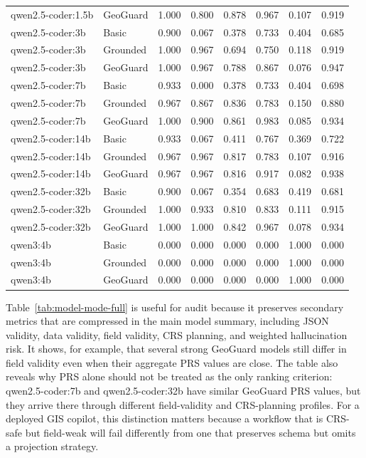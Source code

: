 \documentclass[12pt]{gsis}  %
\begin{document}
\begin{table}[htbp]
\begin{tabular}{llrrrrrr}
qwen2.5-coder:1.5b & GeoGuard & 1.000 & 0.800 & 0.878 & 0.967 & 0.107 & 0.919 \\
qwen2.5-coder:3b & Basic & 0.900 & 0.067 & 0.378 & 0.733 & 0.404 & 0.685 \\
qwen2.5-coder:3b & Grounded & 1.000 & 0.967 & 0.694 & 0.750 & 0.118 & 0.919 \\
qwen2.5-coder:3b & GeoGuard & 1.000 & 0.967 & 0.788 & 0.867 & 0.076 & 0.947 \\
qwen2.5-coder:7b & Basic & 0.933 & 0.000 & 0.378 & 0.733 & 0.404 & 0.698 \\
qwen2.5-coder:7b & Grounded & 0.967 & 0.867 & 0.836 & 0.783 & 0.150 & 0.880 \\
qwen2.5-coder:7b & GeoGuard & 1.000 & 0.900 & 0.861 & 0.983 & 0.085 & 0.934 \\
qwen2.5-coder:14b & Basic & 0.933 & 0.067 & 0.411 & 0.767 & 0.369 & 0.722 \\
qwen2.5-coder:14b & Grounded & 0.967 & 0.967 & 0.817 & 0.783 & 0.107 & 0.916 \\
qwen2.5-coder:14b & GeoGuard & 0.967 & 0.967 & 0.816 & 0.917 & 0.082 & 0.938 \\
qwen2.5-coder:32b & Basic & 0.900 & 0.067 & 0.354 & 0.683 & 0.419 & 0.681 \\
qwen2.5-coder:32b & Grounded & 1.000 & 0.933 & 0.810 & 0.833 & 0.111 & 0.915 \\
qwen2.5-coder:32b & GeoGuard & 1.000 & 1.000 & 0.842 & 0.967 & 0.078 & 0.934 \\
qwen3:4b & Basic & 0.000 & 0.000 & 0.000 & 0.000 & 1.000 & 0.000 \\
qwen3:4b & Grounded & 0.000 & 0.000 & 0.000 & 0.000 & 1.000 & 0.000 \\
qwen3:4b & GeoGuard & 0.000 & 0.000 & 0.000 & 0.000 & 1.000 & 0.000 \\
\bottomrule
\end{tabular}
\end{table}

Table~\ref{tab:model-mode-full} is useful for audit because it preserves secondary metrics that are compressed in the main model summary, including JSON validity, data validity, field validity, CRS planning, and weighted hallucination risk. It shows, for example, that several strong GeoGuard models still differ in field validity even when their aggregate PRS values are close. The table also reveals why PRS alone should not be treated as the only ranking criterion: qwen2.5-coder:7b and qwen2.5-coder:32b have similar GeoGuard PRS values, but they arrive there through different field-validity and CRS-planning profiles. For a deployed GIS copilot, this distinction matters because a workflow that is CRS-safe but field-weak will fail differently from one that preserves schema but omits a projection strategy.
\end{document}
